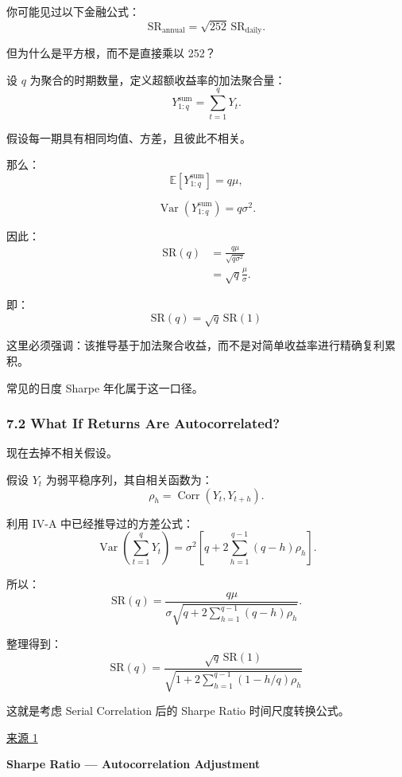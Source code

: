 你可能见过以下金融公式：
\[\mathrm{SR}_{\mathrm{annual}}
=
\sqrt{252}\,
\mathrm{SR}_{\mathrm{daily}}.\]

但为什么是平方根，而不是直接乘以 252？

设 \(q\) 为聚合的时期数量，定义超额收益率的加法聚合量：
\[Y_{1:q}^{\mathrm{sum}}
=
\sum_{t=1}^{q}Y_t.\]

假设每一期具有相同均值、方差，且彼此不相关。

那么：
\[\mathbb E[Y_{1:q}^{\mathrm{sum}}]=q\mu,\]

\[\operatorname{Var}(Y_{1:q}^{\mathrm{sum}})
=q\sigma^2.\]

因此：
\[\begin{aligned}
\mathrm{SR}(q)
&=\frac{q\mu}{\sqrt{q\sigma^2}}\\
&=\sqrt q\frac{\mu}{\sigma}.
\end{aligned}\]

即：
\[\boxed{
\mathrm{SR}(q)=\sqrt q\,\mathrm{SR}(1)
}\]

这里必须强调：该推导基于加法聚合收益，而不是对简单收益率进行精确复利累积。

常见的日度 Sharpe 年化属于这一口径。

\hypertarget{part-4-67-0001-what-if-returns-are-autocorrelated}{%
\subsubsection{7.2 What If Returns Are Autocorrelated?}\label{part-4-67-0001-what-if-returns-are-autocorrelated}}

现在去掉不相关假设。

假设 \(Y_t\) 为弱平稳序列，其自相关函数为：
\[\rho_h=\operatorname{Corr}(Y_t,Y_{t+h}).\]

利用 IV-A 中已经推导过的方差公式：
\[\operatorname{Var}
\left(
\sum_{t=1}^{q}Y_t
\right)
=
\sigma^2
\left[
q+2\sum_{h=1}^{q-1}(q-h)\rho_h
\right].\]

所以：
\[\mathrm{SR}(q)
=
\frac{q\mu}{
\sigma\sqrt{
q+2\sum_{h=1}^{q-1}(q-h)\rho_h
}
}.\]

整理得到：
\[\boxed{
\mathrm{SR}(q)
=
\frac{
\sqrt q\,\mathrm{SR}(1)
}{
\sqrt{
1+2\sum_{h=1}^{q-1}
(1-h/q)\rho_h
}
}
}\]

这就是考虑 Serial Correlation 后的 Sharpe Ratio 时间尺度转换公式。

\href{https://rpc.cfainstitute.org/research/financial-analysts-journal/2002/the-statistics-of-sharpe-ratios}{来源 1}

\textbf{Sharpe Ratio --- Autocorrelation Adjustment}

